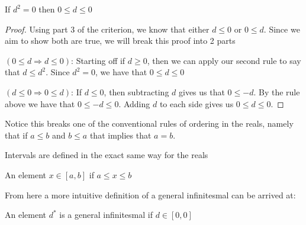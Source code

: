 \begin{theorem}
  If $d^2=0$ then $0 \leq d \leq 0$
\end{theorem} 
\begin{proof}
  Using part 3 of the criterion, we know that either $d\leq 0$ or $0\leq d$. Since we aim to show both are true, we will break this proof into 2 parts

  $(0 \leq d \Rightarrow d \leq 0)$: Starting off if $d\geq 0$, then we can apply our second rule to say that $d \leq d^2$. Since $d^2=0$, we have that $0 \leq d \leq 0$


  $(d \leq 0 \Rightarrow 0 \leq d)$: If $d \leq 0$, then subtracting $d$ gives us that $0 \leq -d$. By the rule above we have that $0 \leq -d \leq 0$. Adding $d$ to each side gives us $0 \leq d \leq 0$.
\end{proof}
Notice this breaks one of the conventional rules of ordering in the reals, namely that if $a \leq b$ and $b\leq a$ that implies that $a=b$.

Intervals are defined in the exact same way for the reals
\begin{definition}
  An element $x\in [a,b]$ if $a \leq x \leq b$
\end{definition}
From here a more intuitive definition of a general infinitesmal can be arrived at:
\begin{definition}
  An element $d^*$ is a general infinitesmal if $d \in [0,0]$
\end{definition}
